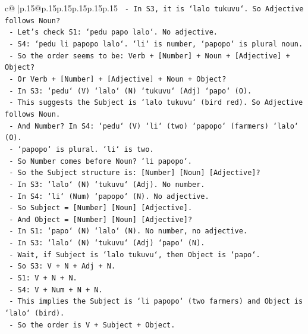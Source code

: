 \documentclass{article}
\begin{document}
{\begin{supertabular}{c@{$\;$}|p{.15\linewidth}@{}p{.15\linewidth}p{.15\linewidth}p{.15\linewidth}p{.15\linewidth}p{.15\linewidth}}
{{{\texttt{        {-} In S3, it is `lalo tukuvu`. So Adjective follows Noun?} \\
\texttt{        {-} Let's check S1: `pedu papo lalo`. No adjective.} \\
\texttt{        {-} S4: `pedu li papopo lalo`. `li` is number, `papopo` is plural noun.} \\
\texttt{        {-} So the order seems to be: Verb + {[}Number{]} + Noun + {[}Adjective{]} + Object?} \\
\texttt{        {-} Or Verb + {[}Number{]} + {[}Adjective{]} + Noun + Object?} \\
\texttt{        {-} In S3: `pedu` (V) `lalo` (N) `tukuvu` (Adj) `papo` (O).} \\
\texttt{        {-} This suggests the Subject is `lalo tukuvu` (bird red). So Adjective follows Noun.} \\
\texttt{        {-} And Number? In S4: `pedu` (V) `li` (two) `papopo` (farmers) `lalo` (O).} \\
\texttt{        {-} `papopo` is plural. `li` is two.} \\
\texttt{        {-} So Number comes before Noun? `li papopo`.} \\
\texttt{        {-} So the Subject structure is: {[}Number{]} {[}Noun{]} {[}Adjective{]}?} \\
\texttt{        {-} In S3: `lalo` (N) `tukuvu` (Adj). No number.} \\
\texttt{        {-} In S4: `li` (Num) `papopo` (N). No adjective.} \\
\texttt{        {-} So Subject = {[}Number{]} {[}Noun{]} {[}Adjective{]}.} \\
\texttt{        {-} And Object = {[}Number{]} {[}Noun{]} {[}Adjective{]}?} \\
\texttt{        {-} In S1: `papo` (N) `lalo` (N). No number, no adjective.} \\
\texttt{        {-} In S3: `lalo` (N) `tukuvu` (Adj) `papo` (N).} \\
\texttt{        {-} Wait, if Subject is `lalo tukuvu`, then Object is `papo`.} \\
\texttt{        {-} So S3: V + N + Adj + N.} \\
\texttt{        {-} S1: V + N + N.} \\
\texttt{        {-} S4: V + Num + N + N.} \\
\texttt{        {-} This implies the Subject is `li papopo` (two farmers) and Object is `lalo` (bird).} \\
\texttt{        {-} So the order is V + Subject + Object.} \\
}}}
\end{supertabular}}
\end{document}
